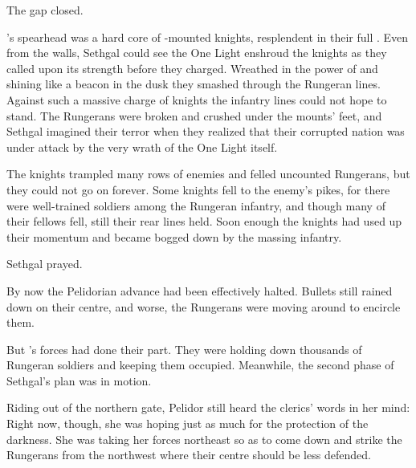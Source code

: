 The gap closed. 

\Kintaer's spearhead was a hard core of \relc-mounted knights, resplendent in their full \armour. 
Even from the walls, Sethgal could see the One Light enshroud the knights as they called upon its strength before they charged. 
Wreathed in the power of \iquin and shining like a beacon in the dusk they smashed through the Rungeran lines.
Against such a massive charge of knights the infantry lines could not hope to stand.
The Rungerans were broken and crushed under the mounts' feet, and Sethgal imagined their terror when they realized that their corrupted nation was under attack by the very wrath of the One Light itself. 

The knights trampled many rows of enemies and felled uncounted Rungerans, but they could not go on forever.
Some knights fell to the enemy's pikes, for there were well-trained soldiers among the Rungeran infantry, and though many of their fellows fell, still their rear lines held. 
Soon enough the knights had used up their momentum and became bogged down by the massing infantry. 

 Sethgal prayed.

By now the Pelidorian advance had been effectively halted.
Bullets still rained down on their centre, and worse, the Rungerans were moving around to encircle them. 


But \Kintaer's forces had done their part. 
They were holding down thousands of Rungeran soldiers and keeping them occupied. 
Meanwhile, the second phase of Sethgal's plan was in motion. 



\begin{comment}
  \subsection{Dornaer rides out}
\end{comment}
Riding out of the northern gate, \Rah[\Dornaer] Pelidor still heard the clerics' words in her mind:
Right now, though, she was hoping just as much for the protection of the darkness. 
She was taking her forces northeast so as to come down and strike the Rungerans from the northwest where their centre should be less defended. 

